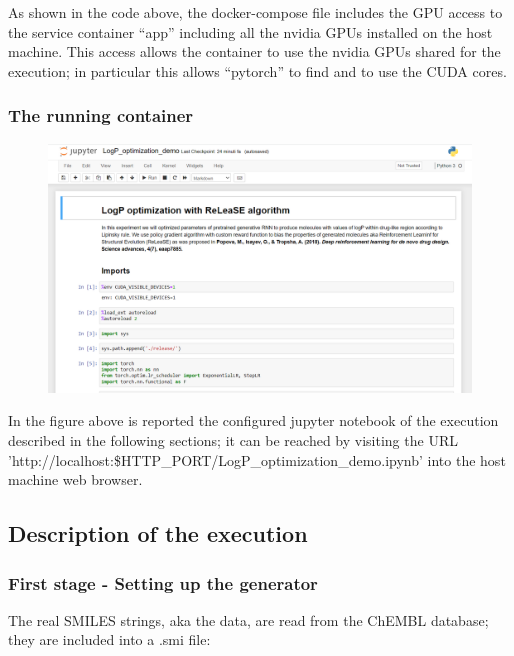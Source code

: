\documentclass[a4paper]{article}
\begin{document}
As shown in the code above, the docker-compose file includes the GPU access \cite{gpu-support} to the service container “app” including all the nvidia GPUs installed on the host machine. This access allows the container to use the nvidia GPUs shared for the execution; in particular this allows “pytorch” to find and to use the CUDA cores.

\subsubsection{The running container}\label{sec:The running container}

\begin{figure}[htbp]
    \centering
        \includegraphics[width=\textwidth]{logp-optimization.png}
    \label{fig:logp-optimization}
\end{figure}

In the figure above is reported the configured jupyter notebook of the execution described in the following sections; it can be reached by visiting the URL 'http://localhost:\${HTTP_PORT}/LogP_optimization_demo.ipynb' into the host machine web browser.

\subsection{Description of the execution}\label{sec:Description of the execution}

\subsubsection{First stage - Setting up the generator}\label{sec:First stage - Setting up the generator}

The real SMILES strings, aka the data, are read from the ChEMBL database; they are included into a .smi file:
\end{document}
